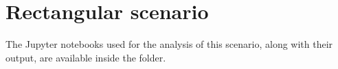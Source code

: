 \section{Rectangular scenario}\label{sec:rectangular}

The Jupyter notebooks used for the analysis of this scenario, along with their
output, are available inside the  folder.




